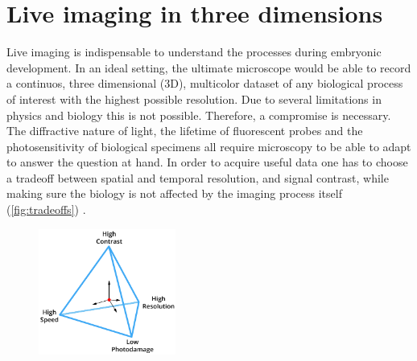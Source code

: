 

\chapter{Live imaging in three dimensions}
\label{ch:intro}

\graphicspath{{./figures/1_spim/}}


Live imaging is indispensable to understand the processes during embryonic development. In an ideal setting, the ultimate microscope would be able to record a continuos, three dimensional (3D), multicolor dataset of any biological process of interest with the highest possible resolution. Due to several limitations in physics and biology this is not possible. Therefore, a compromise is necessary. The diffractive nature of light, the lifetime of fluorescent probes and the photosensitivity of biological specimens all require microscopy to be able to adapt to answer the question at hand. In order to acquire useful data one has to choose a tradeoff between spatial and temporal resolution, and signal contrast, while making sure the biology is not affected by the imaging process itself (\autoref{fig:tradeoffs}) \cite{laissue_assessing_2017}. 

\begin{figure}[bht]
  \centering
  \includegraphics[width=0.4\textwidth]{tradeoffs}
  \label{fig:tradeoffs}
\end{figure}



